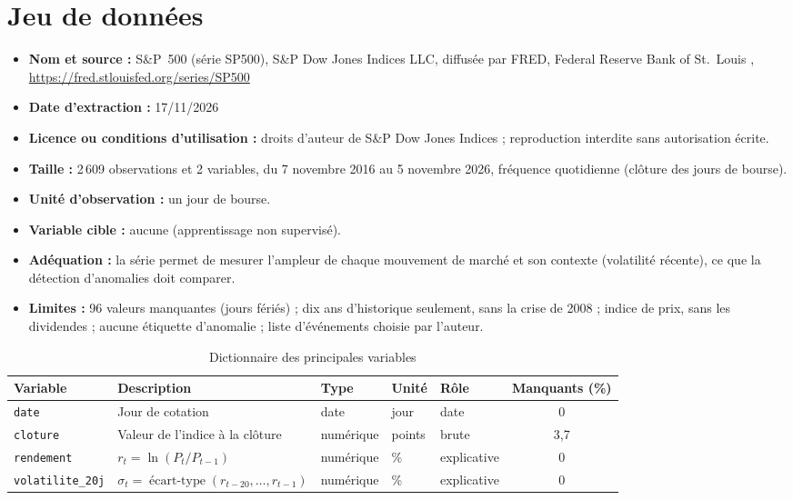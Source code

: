 \documentclass[11pt,a4paper]{article}
\begin{document}
\section{Jeu de données}
\label{sec:donnees}
\begin{itemize}
  \item \textbf{Nom et source :} S\&P~500 (série SP500), S\&P Dow Jones Indices LLC, diffusée par FRED, Federal Reserve Bank of St.~Louis \cite{donnees}, \url{https://fred.stlouisfed.org/series/SP500}
  \item \textbf{Date d'extraction :} 17/11/2026
  \item \textbf{Licence ou conditions d'utilisation :} droits d'auteur de S\&P Dow Jones Indices ; reproduction interdite sans autorisation écrite.
  \item \textbf{Taille :} 2\,609 observations et 2 variables, du 7 novembre 2016 au 5 novembre 2026, fréquence quotidienne (clôture des jours de bourse).
  \item \textbf{Unité d'observation :} un jour de bourse.
  \item \textbf{Variable cible :} aucune (apprentissage non supervisé).
  \item \textbf{Adéquation :} la série permet de mesurer l'ampleur de chaque mouvement de marché et son contexte (volatilité récente), ce que la détection d'anomalies doit comparer.
  \item \textbf{Limites :} 96 valeurs manquantes (jours fériés) ; dix ans d'historique seulement, sans la crise de 2008 ; indice de prix, sans les dividendes ; aucune étiquette d'anomalie ; liste d'événements choisie par l'auteur.
\end{itemize}

\begin{table}[htbp]
  \centering
  \caption{Dictionnaire des principales variables}
  \label{tab:dictionnaire}
  \small
  \begin{tabular}{@{}l P{5.6cm} l l l c@{}}
    \toprule
    Variable & Description & Type & Unité & Rôle & Manquants (\%) \\
    \midrule
    \texttt{date} & Jour de cotation & date & jour & date & 0 \\
    \texttt{cloture} & Valeur de l'indice à la clôture & numérique & points & brute & 3,7 \\
    \texttt{rendement} & $r_t = \ln(P_t / P_{t-1})$ & numérique & \% & explicative & 0 \\
    \texttt{volatilite\_20j} & $\sigma_t = \operatorname{écart-type}(r_{t-20}, \dots, r_{t-1})$ & numérique & \% & explicative & 0 \\
    \bottomrule
  \end{tabular}
\end{table}
\end{document}
